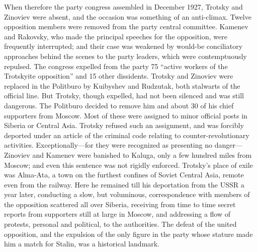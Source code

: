 When therefore the party congress assembled in December 1927, Trotsky and Zinoviev were absent, and the occasion was something of an anti-climax. Twelve opposition members were removed from the party central committee. Kamenev and Rakovsky, who made the principal speeches for the opposition, were frequently interrupted; and their case was weakened by would-be conciliatory approaches behind the scenes to the party leaders, which were contemptuously repulsed. The congress expelled from the party 75 ``active workers of the Trotskyite opposition'' and 15 other dissidents. Trotsky and Zinoviev were replaced in the Politburo by Kuibyshev and Rudzutak, both stalwarts of the official line. But Trotsky, though expelled, had not been silenced and was still dangerous. The Politburo decided to remove him and about 30 of his chief supporters from Moscow. Most of these were assigned to minor official posts in Siberia or Central Asia. Trotsky refused such an assignment, and was forcibly deported under an article of the criminal code relating to counter-revolutionary activities. Exceptionally---for they were recognized as presenting no danger---Zinoviev and Kamenev were banished to Kaluga, only a few hundred miles from Moscow; and even this sentence was not rigidly enforced. Trotsky's place of exile was Alma-Ata, a town on the furthest confines of Soviet Central Asia, remote even from the railway. Here he remained till his deportation from the USSR a year later, conducting a slow, but voluminous, correspondence with members of the opposition scattered all over Siberia, receiving from time to time secret reports from supporters still at large in Moscow, and addressing a flow of protests, personal and political, to the authorities. The defeat of the united opposition, and the expulsion of the only figure in the party whose stature made him a match for Stalin, was a historical landmark. 

